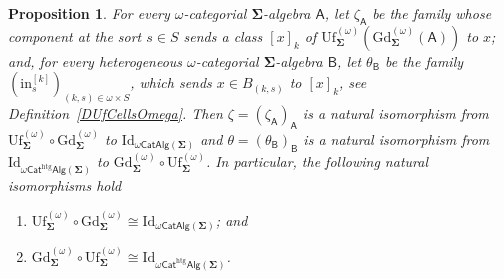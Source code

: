 \documentclass[a4paper, reqno]{amsbook}
\newcommand{\sig}[1]{\mathbf{#1}}             %
\newcommand{\calg}[1]{\boldsymbol{\mathsf{#1}}} %
\newcommand{\htg}{\mathrm{htg}}                %
\newcommand{\Id}{\mathrm{Id}}
\newcommand{\Gd}{\mathrm{Gd}}
\newcommand{\Uf}{\mathrm{Uf}}
\theoremstyle{plain}
\newtheorem{proposition}[theorem]{Proposition}
\theoremstyle{definition}
\begin{document}
\begin{proposition}\label{PGdUfIsoOmega}
For every $\omega$-categorial $\sig{\Sigma}$-algebra $\calg{A}$, let $\zeta_{\calg{A}}$ be the family whose component at the sort $s\in S$ sends a class $[x]_{k}$ of $\Uf^{(\omega)}_{\sig{\Sigma}}(\Gd^{(\omega)}_{\sig{\Sigma}}(\calg{A}))$ to $x$; and, for every heterogeneous $\omega$-categorial $\sig{\Sigma}$-algebra $\calg{B}$, let $\theta_{\calg{B}}$ be the family $(\mathrm{in}^{[k]}_{s})_{(k,s)\in\omega\times S}$, which sends $x\in B_{(k,s)}$ to $[x]_{k}$, see Definition~\ref{DUfCellsOmega}.
Then $\zeta=(\zeta_{\calg{A}})_{\calg{A}}$ is a natural isomorphism from $\Uf^{(\omega)}_{\sig{\Sigma}}\circ\Gd^{(\omega)}_{\sig{\Sigma}}$ to $\Id_{\omega\mathsf{CatAlg}(\sig{\Sigma})}$ and $\theta=(\theta_{\calg{B}})_{\calg{B}}$ is a natural isomorphism from $\Id_{\omega\mathsf{Cat}^{\htg}\mathsf{Alg}(\sig{\Sigma})}$ to $\Gd^{(\omega)}_{\sig{\Sigma}}\circ\Uf^{(\omega)}_{\sig{\Sigma}}$.
In particular, the following natural isomorphisms hold
\begin{enumerate}
	\item
	$\Uf^{(\omega)}_{\sig{\Sigma}}\circ\Gd^{(\omega)}_{\sig{\Sigma}}\cong\Id_{\omega\mathsf{CatAlg}(\sig{\Sigma})}$; and

	\item
	$\Gd^{(\omega)}_{\sig{\Sigma}}\circ\Uf^{(\omega)}_{\sig{\Sigma}}\cong\Id_{\omega\mathsf{Cat}^{\htg}\mathsf{Alg}(\sig{\Sigma})}$.
\end{enumerate}
\end{proposition}
\end{document}
